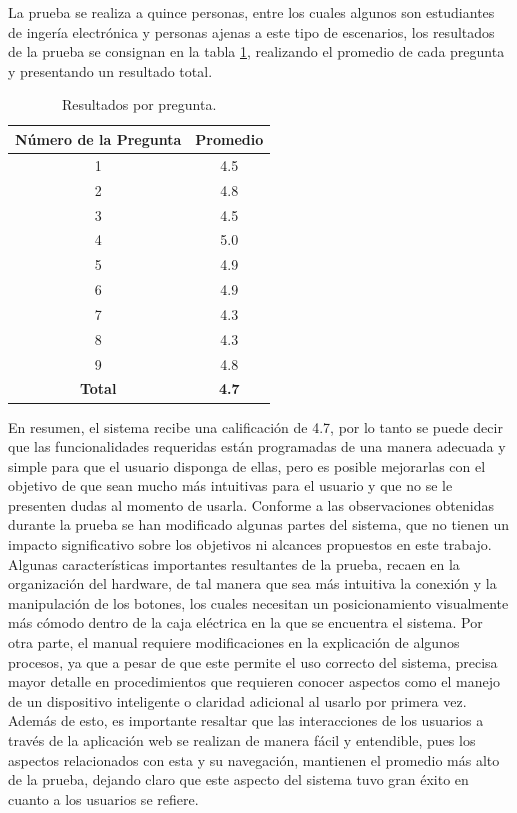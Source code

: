 La prueba se realiza a quince personas, entre los cuales algunos son estudiantes de ingería electrónica y personas ajenas a este tipo de escenarios, los resultados de la prueba se consignan en la tabla \ref{table:enc}, realizando el promedio de cada pregunta y presentando un resultado total.\\

\begin{table}
	\begin{center}
		\caption{Resultados por pregunta.}
		\label{table:enc}
		\begin{tabular}{|c|c|}
			\hline 
			\textbf{Número de la Pregunta} & \textbf{Promedio} \\ 
			\hline 
			1 & 4.5\\ 
			\hline 
			2 & 4.8\\ 
			\hline 
			3 & 4.5\\ 
			\hline 
			4 & 5.0\\ 
			\hline 
			5 & 4.9\\ 
			\hline 
			6 & 4.9\\ 
			\hline 
			7 & 4.3\\ 
			\hline 
			8 & 4.3\\ 
			\hline 
			9 & 4.8\\ 
			\hline 
			\textbf{Total} & \textbf{4.7}\\ 
			\hline 
		\end{tabular} 
	\end{center}
\end{table}

En resumen, el sistema recibe una calificación de 4.7, por lo tanto se puede decir que las funcionalidades requeridas están programadas de una manera adecuada y simple para que el usuario disponga de ellas, pero es posible mejorarlas con el objetivo de que sean mucho más intuitivas para el usuario y que no se le presenten dudas al momento de usarla. Conforme a las observaciones obtenidas durante la prueba se han modificado algunas partes del sistema, que no tienen un impacto significativo sobre los objetivos ni alcances propuestos en este trabajo.\\

Algunas características importantes resultantes de la prueba, recaen en la organización del hardware, de tal manera que sea más intuitiva la conexión y la manipulación de los botones, los cuales necesitan un posicionamiento visualmente más cómodo dentro de la caja eléctrica en la que se encuentra el sistema. Por otra parte, el manual requiere modificaciones en la explicación de algunos procesos, ya que a pesar de que este permite el uso correcto del sistema, precisa mayor detalle en procedimientos que requieren conocer aspectos como el manejo de un dispositivo inteligente o claridad adicional al usarlo por primera vez.\\

Además de esto, es importante resaltar que las interacciones de los usuarios a través de la aplicación web se realizan de manera fácil y entendible, pues los aspectos relacionados con esta y su navegación, mantienen el promedio más alto de la prueba, dejando claro que este aspecto del sistema tuvo gran éxito en cuanto a los usuarios se refiere.\\
